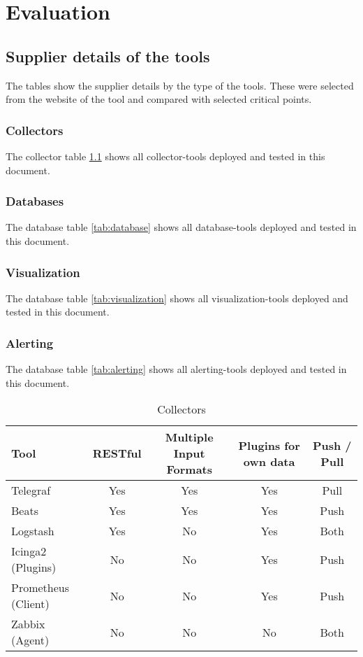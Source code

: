 \chapter{Evaluation} %
\section{Supplier details of the tools}
The tables show the supplier details by the type of the tools. These were selected from the website of the tool and compared with selected critical points. 
\subsection{Collectors}
The collector table \ref{tab:Collector} shows all collector-tools deployed and tested in this document. 
\subsection{Databases}
The database table \ref{tab:database} shows all database-tools deployed and tested in this document.
\subsection{Visualization}
The database table \ref{tab:visualization} shows all visualization-tools deployed and tested in this document.
\subsection{Alerting}
The database table \ref{tab:alerting} shows all alerting-tools deployed and tested in this document.
\begin{table}
\centering
\label{tab:Collector}
\begin{tabular}{p{3cm}cccc}
\hline
Tool & RESTful                     & Multiple Input Formats      & Plugins for own data        & Push / Pull                 \\
\hline
Telegraf                     & Yes & Yes                         & Yes                         & Pull                         \\
Beats                        & Yes                         & Yes & Yes                         & Push                         \\
Logstash                     & Yes                         & No                          & Yes & Both                         \\
Icinga2 (Plugins)            & No                          & No                          & Yes                         & Push \\
Prometheus (Client)          & No                          & No                          & Yes                         & Push \\
Zabbix (Agent)               & No                          & No                          & No  & Both \\
\hline                        
\end{tabular}
\caption{Collectors}
\end{table}


